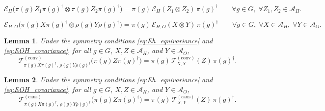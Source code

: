 \documentclass[10pt,a4paper]{amsart}
\newtheorem{lemma}{Lemma}
\begin{document}
\begin{equation}
\mathcal{E}_H\bigl( \pi(g) Z_1 \pi(g)^\dagger \otimes \pi(g) Z_2 \pi(g)^\dagger \bigr) = \pi(g) \, \mathcal{E}_H(Z_1 \otimes Z_2) \, \pi(g)^\dagger \qquad \forall g \in G,\; \forall Z_1, Z_2 \in \mathcal{A}_H.
\label{eq:Eh_equivariance}
\end{equation}

\begin{equation}
\mathcal{E}_{H,O}\bigl( \pi(g) X \pi(g)^\dagger \otimes \rho(g) Y \rho(g)^\dagger \bigr) = \pi(g) \, \mathcal{E}_{H,O}(X \otimes Y) \, \pi(g)^\dagger \qquad \forall g \in G,\; \forall X \in \mathcal{A}_H,\; \forall Y \in \mathcal{A}_O.
\label{eq:EOH_covariance}
\end{equation}

\begin{lemma}\label{lem:conv_cov}
Under the symmetry conditions \eqref{eq:Eh_equivariance} and \eqref{eq:EOH_covariance}, for all \(g \in G\), \(X, Z \in \mathcal{A}_H\), and \(Y \in \mathcal{A}_O\),
\begin{equation}
\mathcal{T}_{\pi(g) X \pi(g)^\dagger, \, \rho(g) Y \rho(g)^\dagger}^{(\text{conv})}\big( \pi(g) Z \pi(g)^\dagger \big) = \pi(g) \, \mathcal{T}_{X,Y}^{(\text{conv})}(Z) \, \pi(g)^\dagger.
\label{eq:conv_covariance}
\end{equation}
\end{lemma}

\begin{lemma}\label{lem:caus_cov}
Under the symmetry conditions \eqref{eq:Eh_equivariance} and \eqref{eq:EOH_covariance}, for all \(g \in G\), \(X, Z \in \mathcal{A}_H\), and \(Y \in \mathcal{A}_O\),
\begin{equation}
\mathcal{T}_{\pi(g) X \pi(g)^\dagger, \, \rho(g) Y \rho(g)^\dagger}^{(\text{caus})}\big( \pi(g) Z \pi(g)^\dagger \big) = \pi(g) \, \mathcal{T}_{X,Y}^{(\text{caus})}(Z) \, \pi(g)^\dagger.
\label{eq:caus_covariance}
\end{equation}
\end{lemma}
\end{document}
